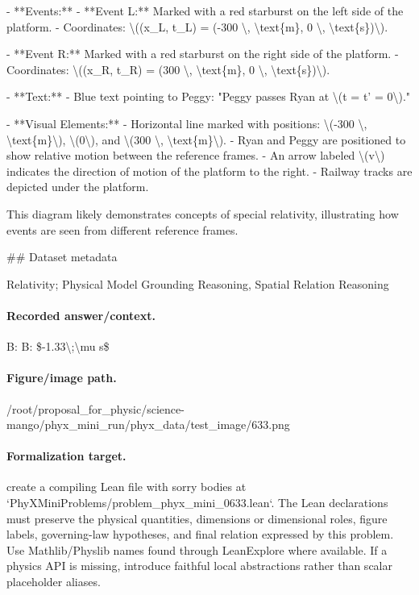 - **Events:**
  - **Event L:** Marked with a red starburst on the left side of the platform.
    - Coordinates: \textbackslash{}((x\_L, t\_L) = (-300 \textbackslash{}, \textbackslash{}text\{m\}, 0 \textbackslash{}, \textbackslash{}text\{s\})\textbackslash{}).

  - **Event R:** Marked with a red starburst on the right side of the platform.
    - Coordinates: \textbackslash{}((x\_R, t\_R) = (300 \textbackslash{}, \textbackslash{}text\{m\}, 0 \textbackslash{}, \textbackslash{}text\{s\})\textbackslash{}).

- **Text:**
  - Blue text pointing to Peggy: "Peggy passes Ryan at \textbackslash{}(t = t' = 0\textbackslash{})."

- **Visual Elements:**
  - Horizontal line marked with positions: \textbackslash{}(-300 \textbackslash{}, \textbackslash{}text\{m\}\textbackslash{}), \textbackslash{}(0\textbackslash{}), and \textbackslash{}(300 \textbackslash{}, \textbackslash{}text\{m\}\textbackslash{}).
  - Ryan and Peggy are positioned to show relative motion between the reference frames.
  - An arrow labeled \textbackslash{}(v\textbackslash{}) indicates the direction of motion of the platform to the right.
  - Railway tracks are depicted under the platform.

This diagram likely demonstrates concepts of special relativity, illustrating how events are seen from different reference frames.

\#\# Dataset metadata

Relativity; Physical Model Grounding Reasoning, Spatial Relation Reasoning

\paragraph{Recorded answer/context.}
B: B: \$-1.33\textbackslash{};\textbackslash{}mu s\$

\paragraph{Figure/image path.}
/root/proposal\_for\_physic/science-mango/phyx\_mini\_run/phyx\_data/test\_image/633.png

\paragraph{Formalization target.}
create a compiling Lean file with sorry bodies at `PhyXMiniProblems/problem\_phyx\_mini\_0633.lean`. The Lean declarations must preserve the physical quantities, dimensions or dimensional roles, figure labels, governing-law hypotheses, and final relation expressed by this problem.
Use Mathlib/Physlib names found through LeanExplore where available. If a physics API is missing, introduce faithful local abstractions rather than scalar placeholder aliases.

